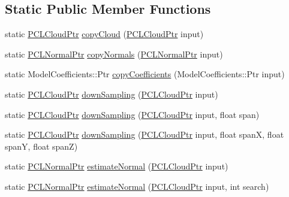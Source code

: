 \subsection*{Static Public Member Functions}
\begin{DoxyCompactItemize}
\item 
static \hyperlink{PCPrimitive_8h_aa14a240c8d999c4f56133c0f70e88783}{P\-C\-L\-Cloud\-Ptr} \hyperlink{classpcm_1_1PCManager_afd0b3ae22849345d490ba27b425254a1}{copy\-Cloud} (\hyperlink{PCPrimitive_8h_aa14a240c8d999c4f56133c0f70e88783}{P\-C\-L\-Cloud\-Ptr} input)
\item 
static \hyperlink{PCPrimitive_8h_a1bc38ce8b0c26e5f2d28fae9f3e3ea97}{P\-C\-L\-Normal\-Ptr} \hyperlink{classpcm_1_1PCManager_aa580e879cf08a919167bcec0b213eb28}{copy\-Normals} (\hyperlink{PCPrimitive_8h_a1bc38ce8b0c26e5f2d28fae9f3e3ea97}{P\-C\-L\-Normal\-Ptr} input)
\item 
static Model\-Coefficients\-::\-Ptr \hyperlink{classpcm_1_1PCManager_aa3397d6597a17ee15d2c539631e008c2}{copy\-Coefficients} (Model\-Coefficients\-::\-Ptr input)
\item 
static \hyperlink{PCPrimitive_8h_aa14a240c8d999c4f56133c0f70e88783}{P\-C\-L\-Cloud\-Ptr} \hyperlink{classpcm_1_1PCManager_ab9c66b0834ca1ef0c1c01e21400103dd}{down\-Sampling} (\hyperlink{PCPrimitive_8h_aa14a240c8d999c4f56133c0f70e88783}{P\-C\-L\-Cloud\-Ptr} input)
\item 
static \hyperlink{PCPrimitive_8h_aa14a240c8d999c4f56133c0f70e88783}{P\-C\-L\-Cloud\-Ptr} \hyperlink{classpcm_1_1PCManager_a32a6c0ad1f2d23e48ddb4302be7d14c5}{down\-Sampling} (\hyperlink{PCPrimitive_8h_aa14a240c8d999c4f56133c0f70e88783}{P\-C\-L\-Cloud\-Ptr} input, float span)
\item 
static \hyperlink{PCPrimitive_8h_aa14a240c8d999c4f56133c0f70e88783}{P\-C\-L\-Cloud\-Ptr} \hyperlink{classpcm_1_1PCManager_a30723a3f4808cd2a161b58c0888d5dfa}{down\-Sampling} (\hyperlink{PCPrimitive_8h_aa14a240c8d999c4f56133c0f70e88783}{P\-C\-L\-Cloud\-Ptr} input, float span\-X, float span\-Y, float span\-Z)
\item 
static \hyperlink{PCPrimitive_8h_a1bc38ce8b0c26e5f2d28fae9f3e3ea97}{P\-C\-L\-Normal\-Ptr} \hyperlink{classpcm_1_1PCManager_ab2cdef39cbe4f3d6c3660d873bd9a38e}{estimate\-Normal} (\hyperlink{PCPrimitive_8h_aa14a240c8d999c4f56133c0f70e88783}{P\-C\-L\-Cloud\-Ptr} input)
\item 
static \hyperlink{PCPrimitive_8h_a1bc38ce8b0c26e5f2d28fae9f3e3ea97}{P\-C\-L\-Normal\-Ptr} \hyperlink{classpcm_1_1PCManager_a7cad87bdc0a16f5b4b6108259ace90d3}{estimate\-Normal} (\hyperlink{PCPrimitive_8h_aa14a240c8d999c4f56133c0f70e88783}{P\-C\-L\-Cloud\-Ptr} input, int search)

\end{DoxyCompactItemize}
